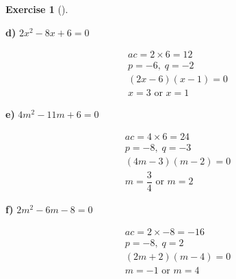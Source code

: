 \documentclass[
  letterpaper,
  DIV=11,
  numbers=noendperiod]{scrreprt}
\theoremstyle{definition}
\newtheorem{exercise}{Exercise}[chapter]
\theoremstyle{remark}
\begin{document}
\begin{exercise}[]
\begin{tcolorbox}
\textbf{d)} \(\displaystyle 2x^2 - 8x + 6 = 0\)

\begin{align*}
ac = 2 \times 6 = 12 \\ p = -6,\; q = -2 \\ (2x - 6)(x - 1) = 0 \\ x = 3 \text{ or } x = 1
\end{align*}

\textbf{e)} \(\displaystyle 4m^2 - 11m + 6 = 0\)

\begin{align*}
ac = 4 \times 6 = 24 \\ p = -8,\; q = -3 \\ (4m - 3)(m - 2) = 0 \\ m = \dfrac{3}{4} \text{ or } m = 2
\end{align*}

\textbf{f)} \(\displaystyle 2m^2 - 6m - 8 = 0\)

\begin{align*}
ac = 2 \times -8 = -16 \\ p = -8,\; q = 2 \\ (2m + 2)(m - 4) = 0 \\ m = -1 \text{ or } m = 4
\end{align*}

\end{tcolorbox}

\end{exercise}
\end{document}
